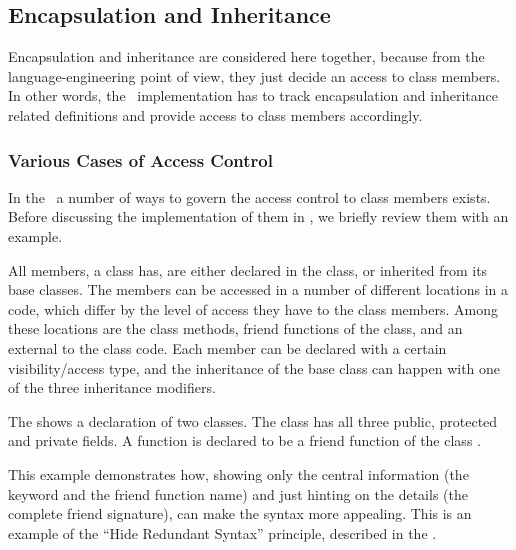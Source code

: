\subsection{Encapsulation and Inheritance}


Encapsulation and inheritance are considered here together, because from the language-engineering point of view, 
they just decide an access to class members. In other words, the \pcpp\ implementation has to track
encapsulation and inheritance related definitions and provide access to class members accordingly.


\subsubsection{Various Cases of Access Control}
\label{accessandfriends}

\cppproblem

In the \cpppl\ a number of ways to govern the access control to class members exists. Before discussing 
the implementation of them in \pcpp, we briefly review them with an example.

All members, a class has, are either declared in the class, or inherited from its base classes. 
The members can be accessed in a number of different locations in a code, which differ by the level of access they have
to the class members. Among these locations are the class methods, friend functions of the class, and
an external to the class code. 
Each member can be declared with a certain visibility/access type, and the inheritance
of the base class can happen with one of the three inheritance modifiers. 



\pcppsolution


The  shows a declaration of two classes. The class  has all three
public, protected and private fields. A function  is declared to be a
friend function of  the class . 

This example demonstrates how, showing only the central information (the keyword  and the
friend function name) and just hinting on the details (the complete friend signature), can make 
the syntax more appealing. This is an example of the ``Hide Redundant Syntax'' principle, described in the .

